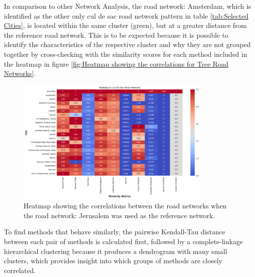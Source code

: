 In comparison to other Network Analysis, the road network: Amsterdam, which is identified as the other only cul de sac road network pattern in table \ref{tab:Selected Cities}, is located within the same cluster (green), but at a greater distance from the reference road network. This is to be expected because it is possible to identify the characteristics of the respective cluster and why they are not grouped together by cross-checking with the similarity scores for each method included in the heatmap in figure \ref{fig:Heatmap showing the correlations for Tree Road Networks}.


\begin{figure}[!ht]
\centering
\includegraphics[width=0.85\textwidth,center]{picture/Cul De Sac/culdesacheatmap.png}
\caption[Heatmap showing the correlations for Cul De Sac Road Networks]{Heatmap showing the correlations between the road networks when the road network: Jerusalem was used as the reference network.}
\label{fig:Heatmap showing the correlations for Cul De Sac Road Networks}
\end{figure}

To find methods that behave similarly, the pairwise Kendall-Tau distance between each pair of methods is calculated first, followed by a complete-linkage hierarchical clustering because it produces a dendrogram with many small clusters, which provides insight into which groups of methods are closely correlated.

